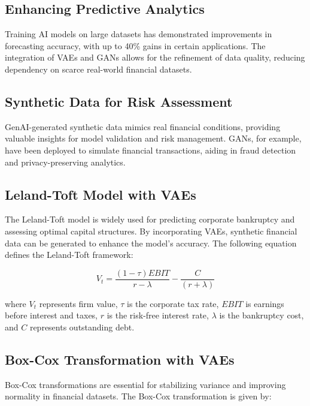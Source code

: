 \documentclass[a4paper,headinclude=on,footinclude=on,12pt,oneside]{scrbook}
\begin{document}
	
	\subsection{Enhancing Predictive Analytics}
	Training AI models on large datasets has demonstrated improvements in forecasting accuracy, with up to 40\% gains in certain applications. The integration of VAEs and GANs allows for the refinement of data quality, reducing dependency on scarce real-world financial datasets.
	
	\subsection{Synthetic Data for Risk Assessment}
	GenAI-generated synthetic data mimics real financial conditions, providing valuable insights for model validation and risk management. GANs, for example, have been deployed to simulate financial transactions, aiding in fraud detection and privacy-preserving analytics.
	
	
	\subsection{Leland-Toft Model with VAEs}
	The Leland-Toft model is widely used for predicting corporate bankruptcy and assessing optimal capital structures. By incorporating VAEs, synthetic financial data can be generated to enhance the model’s accuracy. The following equation defines the Leland-Toft framework:
	
	\begin{equation}
		V_t = \frac{(1 - \tau) EBIT}{r - \lambda} - \frac{C}{(r + \lambda)}
	\end{equation}
	
	where $V_t$ represents firm value, $\tau$ is the corporate tax rate, $EBIT$ is earnings before interest and taxes, $r$ is the risk-free interest rate, $\lambda$ is the bankruptcy cost, and $C$ represents outstanding debt.
	
	\subsection{Box-Cox Transformation with VAEs}
	Box-Cox transformations are essential for stabilizing variance and improving normality in financial datasets. The Box-Cox transformation is given by:
	
\end{document}
